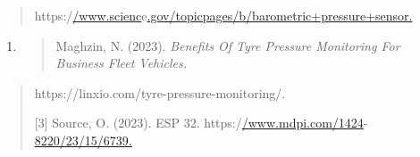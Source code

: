 \documentclass[
]{article}
\begin{document}
\begin{quote}
https:/\href{http://www.science.gov/topicpages/b/barometric\%2Bpressure\%2Bsensor}{/www.scienc}e\href{http://www.science.gov/topicpages/b/barometric\%2Bpressure\%2Bsensor}{.gov/topicpages/b/barometric+pressure+sensor.}
\end{quote}

\begin{enumerate}
\def\labelenumi{\arabic{enumi}.}
\setcounter{enumi}{1}
\item
  \begin{quote}
  Maghzin, N. (2023). \emph{Benefits Of Tyre Pressure Monitoring For
  Business Fleet Vehicles.}
  \end{quote}
\end{enumerate}

\begin{quote}
https://linxio.com/tyre-pressure-monitoring/.

{[}3{]} Source, O. (2023). ESP 32.
https:/\href{http://www.mdpi.com/1424-8220/23/15/6739}{/www.mdpi.com/1424}-\href{http://www.mdpi.com/1424-8220/23/15/6739}{8220/23/15/6739.}
\end{quote}
\end{document}
